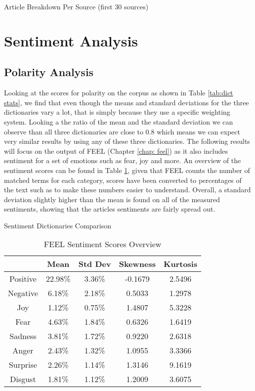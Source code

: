 \begin{table}[]
\caption{Article Breakdown Per Source (first 30 sources)}
\label{tab:stat source}
\centering
{}
\end{table}

\section{Sentiment Analysis}

\subsection{Polarity Analysis}

Looking at the scores for polarity on the corpus as shown in Table \ref{tab:dict stats}, we find that even though the means and standard deviations for the three dictionaries vary a lot, that is simply because they use a specific weighting system. Looking a the ratio of the mean and the standard deviation we can observe than all three dictionaries are close to 0.8 which means we can expect very similar results by using any of these three dictionaries. The following results will focus on the output of FEEL (Chapter \ref{chap: feel}) as it also includes sentiment for a set of emotions such as fear, joy and more. An overview of the sentiment scores can be found in Table \ref{tab:feel stats}, given that FEEL counts the number of matched terms for each category, scores have been converted to percentages of the text such as to make these numbers easier to understand. Overall, a standard deviation slightly higher than the mean is found on all of the measured sentiments, showing that the articles sentiments are fairly spread out.

\begin{table}[]
\caption{Sentiment Dictionaries Comparison}
\label{tab:dict stats}
\centering
{}
\end{table}

\begin{table}[]
\caption{FEEL Sentiment Scores Overview}
\label{tab:feel stats}
\centering
\begin{tabular}{@{}ccccc@{}}
\toprule
         & Mean    & Std Dev & Skewness & Kurtosis \\ \midrule
Positive & 22.98\% & 3.36\%  & -0.1679  & 2.5496   \\
Negative & 6.18\%  & 2.18\%  & 0.5033   & 1.2978   \\
Joy      & 1.12\%  & 0.75\%  & 1.4807   & 5.3228   \\
Fear     & 4.63\%  & 1.84\%  & 0.6326   & 1.6419   \\
Sadness  & 3.81\%  & 1.72\%  & 0.9220   & 2.6318   \\
Anger    & 2.43\%  & 1.32\%  & 1.0955   & 3.3366   \\
Surprise & 2.26\%  & 1.14\%  & 1.3146   & 9.1619   \\
Disgust  & 1.81\%  & 1.12\%  & 1.2009   & 3.6075   \\ \bottomrule
\end{tabular}
\end{table}

